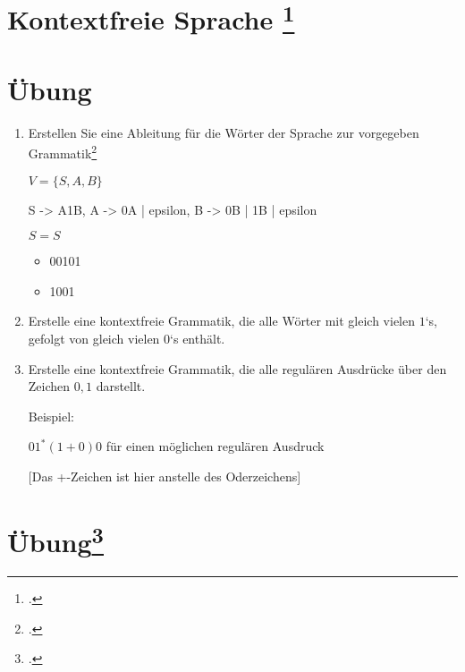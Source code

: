 \documentclass{lehramt-informatik-aufgabe}
\begin{document}
\section{Kontextfreie Sprache
\footcite{theo:fs:2}}

\section{Übung}
\begin{enumerate}
\item Erstellen Sie eine Ableitung für die Wörter der Sprache zur
vorgegeben Grammatik\footcite[Seite 10]{theo:fs:2}

$V = \{ S, A, B \}$


\begin{liProduktionsRegeln}
S -> A1B,
A -> 0A | epsilon,
B -> 0B | 1B | epsilon
\end{liProduktionsRegeln}

$S = S$

\begin{itemize}
\item 00101
\item 1001
\end{itemize}

\item Erstelle eine kontextfreie Grammatik, die alle Wörter mit gleich
vielen $1$‘s, gefolgt von gleich vielen $0$‘s enthält.

\item Erstelle eine kontextfreie Grammatik, die alle regulären Ausdrücke
über den Zeichen $0,1$ darstellt.

Beispiel:

$01^* (1 + 0)0$ für einen möglichen regulären Ausdruck

[Das +-Zeichen ist hier anstelle des Oderzeichens]

\end{enumerate}

%

\section{Übung\footcite[Seite 18]{theo:fs:2}}
\end{document}

